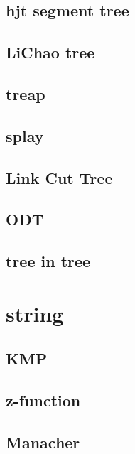 \documentclass[UTF8, a4paper, titlepage, twoside]{ctexart}
\begin{document}
\subsection{hjt segment tree}



\subsection{LiChao tree}

\subsection{treap}


\subsection{splay}



\subsection{Link Cut Tree}
\subsection{ODT}
\subsection{tree in tree}

\section{string}
\subsection{KMP}


\subsection{z-function}


\subsection{Manacher}

\end{document}
